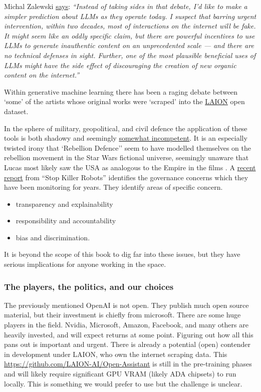  	
Michal Zalewski \href{https://lcamtuf.substack.com/p/llms-a-bleak-future-ahead}{says}: \textit{``Instead of taking sides in that debate, I’d like to make a simpler prediction about LLMs as they operate today. I suspect that barring urgent intervention, within two decades, most of interactions on the internet will be fake. It might seem like an oddly specific claim, but there are powerful incentives to use LLMs to generate inauthentic content on an unprecedented scale — and there are no technical defenses in sight. Further, one of the most plausible beneficial uses of LLMs might have the side effect of discouraging the creation of new organic content on the internet.''}

Within generative machine learning there has been a raging debate between `some' of the artists whose original works were `scraped' into the \href{https://laion.ai/}{LAION} open dataset. \par
In the sphere of military, geopolitical, and civil defence the application of these tools is both shadowy and seemingly \href{https://www.vox.com/recode/23507236/inside-disruption-rebellion-defense-washington-connected-military-tech-startup}{somewhat incompetent}. It is an especially twisted irony that `Rebellion Defence'' seem to have modelled themselves on the rebellion movement in the Star Wars fictional universe, seemingly unaware that Lucas most likely saw the USA as analogous to the Empire in the films \cite{immerwahr202221}. A \href{https://www.stopkillerrobots.org/wp-content/uploads/2022/10/ADR-Artificial-intelligence-and-automated-decisions-Single-View.pdf}{recent report} from ``Stop Killer Robots'' identifies the governance concerns which they have been monitoring for years. They identify areas of specific concern.
\begin{itemize}
\item transparency and explainability \item responsibility and  accountability
\item bias and discrimination.
\end{itemize}
It is beyond the scope of this book to dig far into these issues, but they have serious implications for anyone working in the space.

\subsubsection{The players, the politics, and our choices}
The previously mentioned OpenAI is not open. They publish much open source material, but their investment is chiefly from microsoft. There are some huge players in the field. Nvidia, Microsoft, Amazon, Facebook, and many others are heavily invested, and will expect returns at some point. Figuring out how all this pans out is important and urgent. There is already a potential (open) contender in development under LAION, who own the internet scraping data. This \href{'Open-Assistant'}{https://github.com/LAION-AI/Open-Assistant} is still in the pre-training phases and will likely require significant GPU VRAM (likely ADA chipsets) to run locally. This is something we would prefer to use but the challenge is unclear.
